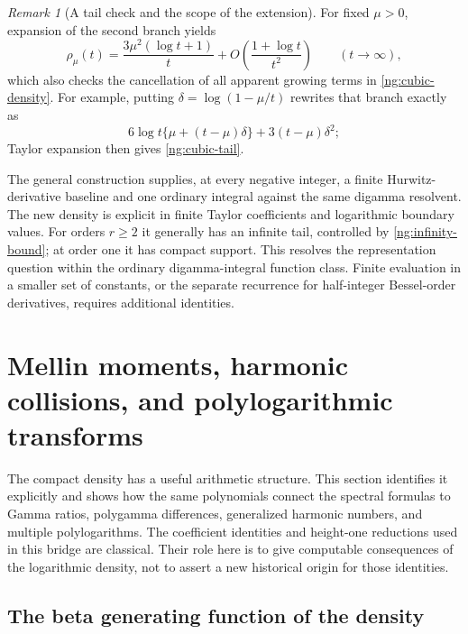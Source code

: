 \documentclass[11pt,letterpaper]{article}
\numberwithin{equation}{section}
\theoremstyle{definition}
\theoremstyle{remark}
\newtheorem{remark}[theorem]{Remark}
\begin{document}
\begin{remark}[A tail check and the scope of the extension]
\label{ng:scope}
For fixed $\mu>0$, expansion of the second branch yields
\begin{equation}
 \rho_\mu(t)=\frac{3\mu^2(\log t+1)}{t}
                  +O\left(\frac{1+\log t}{t^2}\right)
                       \qquad(t\to\infty),
 \label{ng:cubic-tail}
\end{equation}
which also checks the cancellation of all apparent growing
terms in \eqref{ng:cubic-density}.
For example, putting $\delta=\log(1-\mu/t)$ rewrites that
branch exactly as
\[
 6\log t\{\mu+(t-\mu)\delta\}+3(t-\mu)\delta^2;
\]
Taylor expansion then gives \eqref{ng:cubic-tail}.

The general construction supplies, at every negative integer,
a finite Hurwitz-derivative baseline and one ordinary integral
against the same digamma resolvent.  The new density is explicit
in finite Taylor coefficients and logarithmic boundary values.
For orders $r\geq2$ it generally has an infinite tail, controlled
by \eqref{ng:infinity-bound}; at order one it has compact support.
This resolves the representation question within the ordinary
digamma-integral function class.  Finite evaluation in a smaller
set of constants, or the separate recurrence for half-integer Bessel-order
derivatives, requires additional identities.
\end{remark}



\section{Mellin moments, harmonic collisions, and polylogarithmic transforms}
\label{da:section}

The compact density has a useful arithmetic structure. This section
identifies it explicitly and shows how the same polynomials connect the
spectral formulas to Gamma ratios, polygamma differences, generalized
harmonic numbers, and multiple polylogarithms. The coefficient identities
and height-one reductions used in this bridge are classical. Their role
here is to give computable consequences of the logarithmic density, not
to assert a new historical origin for those identities.

\subsection{The beta generating function of the density}
\end{document}
